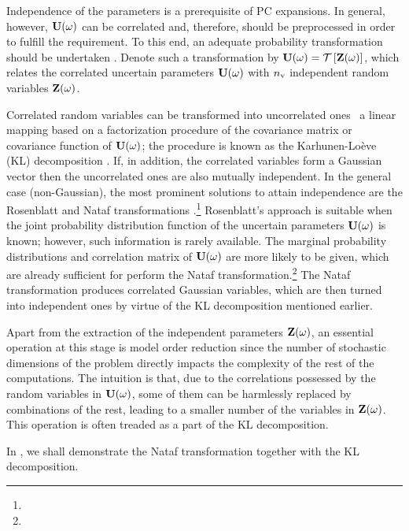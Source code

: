 Independence of the parameters is a prerequisite of PC expansions.
In general, however, $\mathbf{U}(\omega)$ can be correlated and, therefore, should be preprocessed in order to fulfill the requirement.
To this end, an adequate probability transformation should be undertaken \cite{eldred2008}.
Denote such a transformation by $\vU(\o) = \oTransform{\vZ(\o)}$, which relates the correlated uncertain parameters $\mathbf{U}(\omega)$ with ${n_\text{v}}$ independent random variables $\mathbf{Z}(\omega)$.

Correlated random variables can be transformed into uncorrelated ones \via\ a linear mapping based on a factorization procedure of the covariance matrix or covariance function of $\mathbf{U}(\omega)$; the procedure is known as the Karhunen-Lo\`{e}ve (KL) decomposition \cite{ghanem1991}.
If, in addition, the correlated variables form a Gaussian vector then the uncorrelated ones are also mutually independent.
In the general case (non-Gaussian), the most prominent solutions to attain independence are the Rosenblatt \cite{rosenblatt1952} and Nataf transformations \cite{li2008}.\footnote{}
Rosenblatt's approach is suitable when the joint probability distribution function of the uncertain parameters $\mathbf{U}(\omega)$ is known; however, such information is rarely available.
The marginal probability distributions and correlation matrix of $\mathbf{U}(\omega)$ are more likely to be given, which are already sufficient for perform the Nataf transformation.\footnote{}
The Nataf transformation produces correlated Gaussian variables, which are then turned into independent ones by virtue of the KL decomposition mentioned earlier.

Apart from the extraction of the independent parameters $\mathbf{Z}(\omega)$, an essential operation at this stage is model order reduction since the number of stochastic dimensions of the problem directly impacts the complexity of the rest of the computations.
The intuition is that, due to the correlations possessed by the random variables in $\mathbf{U}(\omega)$, some of them can be harmlessly replaced by combinations of the rest, leading to a smaller number of the variables in $\mathbf{Z}(\omega)$.
This operation is often treaded as a part of the KL decomposition.

In , we shall demonstrate the Nataf transformation together with the KL decomposition.
